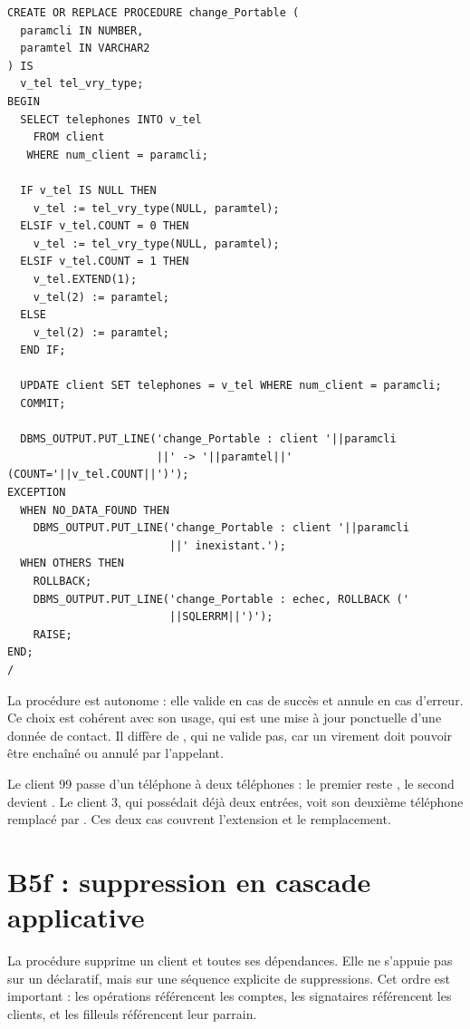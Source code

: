 \begin{lstlisting}[caption={Procédure \code{change\_Portable}.},label={lst:change-portable}]
CREATE OR REPLACE PROCEDURE change_Portable (
  paramcli IN NUMBER,
  paramtel IN VARCHAR2
) IS
  v_tel tel_vry_type;
BEGIN
  SELECT telephones INTO v_tel
    FROM client
   WHERE num_client = paramcli;

  IF v_tel IS NULL THEN
    v_tel := tel_vry_type(NULL, paramtel);
  ELSIF v_tel.COUNT = 0 THEN
    v_tel := tel_vry_type(NULL, paramtel);
  ELSIF v_tel.COUNT = 1 THEN
    v_tel.EXTEND(1);
    v_tel(2) := paramtel;
  ELSE
    v_tel(2) := paramtel;
  END IF;

  UPDATE client SET telephones = v_tel WHERE num_client = paramcli;
  COMMIT;

  DBMS_OUTPUT.PUT_LINE('change_Portable : client '||paramcli
                       ||' -> '||paramtel||'  (COUNT='||v_tel.COUNT||')');
EXCEPTION
  WHEN NO_DATA_FOUND THEN
    DBMS_OUTPUT.PUT_LINE('change_Portable : client '||paramcli
                         ||' inexistant.');
  WHEN OTHERS THEN
    ROLLBACK;
    DBMS_OUTPUT.PUT_LINE('change_Portable : echec, ROLLBACK ('
                         ||SQLERRM||')');
    RAISE;
END;
/
\end{lstlisting}

La procédure est autonome : elle valide en cas de succès et annule en cas
d'erreur. Ce choix est cohérent avec son usage, qui est une mise à jour
ponctuelle d'une donnée de contact. Il diffère de , qui ne
valide pas, car un virement doit pouvoir être enchaîné ou annulé par
l'appelant.

\begin{clebox}
Le client 99 passe d'un téléphone à deux téléphones : le premier reste
, le second devient . Le client 3,
qui possédait déjà deux entrées, voit son deuxième téléphone remplacé par
. Ces deux cas couvrent l'extension et le remplacement.
\end{clebox}

\section{B5f : suppression en cascade applicative}

La procédure  supprime un client et toutes ses dépendances.
Elle ne s'appuie pas sur un  déclaratif, mais sur une
séquence explicite de suppressions. Cet ordre est important : les opérations
référencent les comptes, les signataires référencent les clients, et les
filleuls référencent leur parrain.

